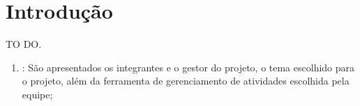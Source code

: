 \chapter[Introdução]{Introdução}
\label{chap:introducao}
	
	TO DO.

	\begin{enumerate}
		\item{\textbf{}: São apresentados os integrantes e o gestor do projeto, o tema escolhido para o projeto, além da ferramenta de gerenciamento de atividades escolhida pela equipe;}
	\end{enumerate}
